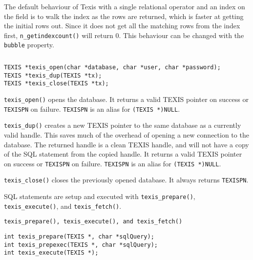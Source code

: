 The default behaviour of Texis with a single relational operator and an
index on the field is to walk the index as the rows are returned, which
is faster at getting the initial rows out.  Since it does not get all the
matching rows from the index first, {\tt n\_getindexcount()} will return 0.
This behaviour can be changed with the {\tt bubble} property.

\EXAMPLE
\begin{verbatim}
\end{verbatim}


\SYNOPSIS
\begin{verbatim}
TEXIS *texis_open(char *database, char *user, char *password);
TEXIS *texis_dup(TEXIS *tx);
TEXIS *texis_close(TEXIS *tx);
\end{verbatim}

\DESCRIPTION

\verb`texis_open()` opens the database. It returns a valid TEXIS pointer
on success or \verb`TEXISPN` on failure. \verb`TEXISPN` is an alias for
\verb`(TEXIS *)NULL`.

\verb`texis_dup()` creates a new TEXIS pointer to the same database as a
currently valid handle.  This saves much of the overhead of opening
a new connection to the database.  The returned handle is a clean
TEXIS handle, and will not have a copy of the SQL statement from the
copied handle.
It returns a valid TEXIS pointer on success or
\verb`TEXISPN` on failure. \verb`TEXISPN` is an alias for \verb`(TEXIS *)NULL`.

\verb`texis_close()` closes the previously opened database.  It always
returns \verb`TEXISPN`.

SQL statements are setup and executed with \verb`texis_prepare()`,
\verb`texis_execute()`, and \verb`texis_fetch()`.

\SEE
\begin{verbatim}
texis_prepare(), texis_execute(), and texis_fetch()
\end{verbatim}


\SYNOPSIS
\begin{verbatim}
int texis_prepare(TEXIS *, char *sqlQuery);
int texis_prepexec(TEXIS *, char *sqlQuery);
int texis_execute(TEXIS *);
\end{verbatim}

